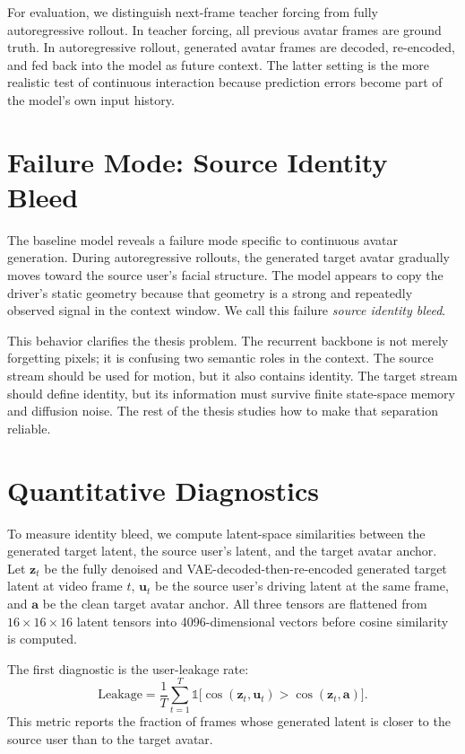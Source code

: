 \documentclass[12pt,letterpaper]{report}
\begin{document}
For evaluation, we distinguish next-frame teacher forcing from fully autoregressive rollout. In teacher forcing, all previous avatar frames are ground truth. In autoregressive rollout, generated avatar frames are decoded, re-encoded, and fed back into the model as future context. The latter setting is the more realistic test of continuous interaction because prediction errors become part of the model's own input history.

\section{Failure Mode: Source Identity Bleed}

The baseline model reveals a failure mode specific to continuous avatar generation. During autoregressive rollouts, the generated target avatar gradually moves toward the source user's facial structure. The model appears to copy the driver's static geometry because that geometry is a strong and repeatedly observed signal in the context window. We call this failure \textit{source identity bleed}.

This behavior clarifies the thesis problem. The recurrent backbone is not merely forgetting pixels; it is confusing two semantic roles in the context. The source stream should be used for motion, but it also contains identity. The target stream should define identity, but its information must survive finite state-space memory and diffusion noise. The rest of the thesis studies how to make that separation reliable.

\section{Quantitative Diagnostics}

To measure identity bleed, we compute latent-space similarities between the generated target latent, the source user's latent, and the target avatar anchor. Let $\mathbf{z}_t$ be the fully denoised and VAE-decoded-then-re-encoded generated target latent at video frame $t$, $\mathbf{u}_t$ be the source user's driving latent at the same frame, and $\mathbf{a}$ be the clean target avatar anchor. All three tensors are flattened from $16 \times 16 \times 16$ latent tensors into 4096-dimensional vectors before cosine similarity is computed.

The first diagnostic is the user-leakage rate:
\begin{equation}
    \text{Leakage} = \frac{1}{T} \sum_{t=1}^{T} \mathbb{1} \Big[ \cos(\mathbf{z}_t, \mathbf{u}_t) > \cos(\mathbf{z}_t, \mathbf{a}) \Big].
\end{equation}
This metric reports the fraction of frames whose generated latent is closer to the source user than to the target avatar.
\end{document}
